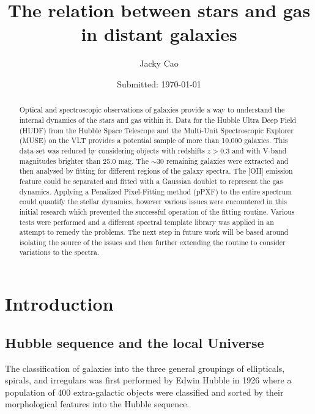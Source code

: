 \documentclass[12pt, twocolumn]{revtex4}    %
\begin{document}
                     

\title{The relation between stars and gas in distant galaxies} 
\date{Submitted: \today{}}
\author{Jacky Cao}

\begin{abstract}              

Optical and spectroscopic observations of galaxies provide a way to understand the internal dynamics of the stars and gas within it. Data for the Hubble Ultra Deep Field (HUDF) from the Hubble Space Telescope and the Multi-Unit Spectroscopic Explorer (MUSE) on the VLT provides a potential sample of more than 10,000 galaxies. This data-set was reduced by considering objects with redshifts $z>0.3$ and with V-band magnitudes brighter than 25.0 mag. The $\sim30$ remaining galaxies were extracted and then analysed by fitting for different regions of the galaxy spectra. The [OII] emission feature could be separated and fitted with a Gaussian doublet to represent the gas dynamics. Applying a Penalized Pixel-Fitting method (pPXF) to the entire spectrum could quantify the stellar dynamics, however various issues were encountered in this initial research which prevented the successful operation of the fitting routine. Various tests were performed and a different spectral template library was applied in an attempt to remedy the problems. The next step in future work will be based around isolating the source of the issues and then further extending the routine to consider variations to the spectra.

\end{abstract}

\maketitle

\tableofcontents

\clearpage

\section{Introduction} 

\subsection{Hubble sequence and the local Universe}
The classification of galaxies into the three general groupings of ellipticals, spirals, and irregulars was first performed by Edwin Hubble in 1926 \citep{1926ApJ....64..321H} where a population of 400 extra-galactic objects were classified and sorted by their morphological features into the Hubble sequence.
\end{document}
